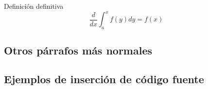 	\begin{defn}
		Definición definitiva
		$$\frac{d}{dx}\int_a^xf(y)dy=f(x)$$
	\end{defn}

	\lipsum[115]

\subsection{Otros párrafos más normales}

	\lipsum[7]


	\lipsum[2]

	\begin{multicols}{2}

		\lipsum[4]

		
		\lipsum[5]

	\end{multicols}

\subsection{Ejemplos de inserción de código fuente}

	\newcommand{\insertsrcmanual}[2]{\href{https://latex.ppizarror.com/informe.html?srctype=#1\#hlp-srccode}{#2}}

